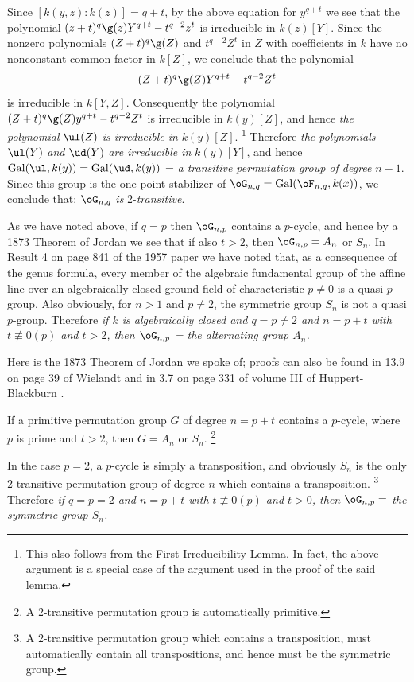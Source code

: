 Since $[k(y,z):k(z)]= q+t$, by the above equation for 
$y^{q+t}$ we see that
the polynomial $(z+t)^q\g(z)Y^{q+t}-t^{q-2}z^t$ is 
irreducible in $k(z)[Y]$.
Since the nonzero polynomials %
$(Z+t)^q\g(Z)$ and $t^{q-2}Z^t$ in $Z$ with
coefficients in $k$ have no nonconstant common factor in 
$k[Z]$, we conclude 
that the polynomial 
$$(Z+t)^q\g(Z)Y^{q+t}-t^{q-2}Z^t$$
is irreducible in 
$k[Y,Z]$. Consequently the polynomial $(Z+t)^q\g(Z)y^{q+
t}-t^{q-2}Z^t$
is irreducible in $k(y)[Z]$, and hence {\it the 
polynomial} $\ul(Z)$
{\it is irreducible in} $k(y)[Z]$. 
\footnote{This also follows from the First Irreducibility 
Lemma. In fact, the
above argument is a special case of the argument used in 
the proof of the said
lemma.}
Therefore {\it the polynomials}
$\ul(Y)$ {\it and} $\ud(Y)$ {\it are irreducible in} 
$k(y)[Y]$,
and hence 
$\operatorname{Gal}(\ul,k(y))= 
\operatorname{Gal}(\ud,k(y))$ = {\it a transitive
permutation group of degree} $n-1$. Since this group is the
one-point stabilizer of $\oG_{n,q}= 
\operatorname{Gal}(\oF_{n,q},k(x))$,
we conclude that: $\oG_{n,q}$ {\it is} 2-{\it transitive}.

As we have noted above, if $q=p$ then
$\oG_{n,p}$ contains a $p$-cycle, and hence by a 1873 
Theorem of Jordan
we see that if also $t>2$, then $\oG_{n,p}=A_n$ or $S_n$. 
In Result 4 on page 
841 of the 1957 paper \cite{A3} we have noted that, as a 
consequence of the 
genus formula, every member of the algebraic fundamental 
group
of the affine line over an algebraically closed
ground field of characteristic $p\ne 0$ is a quasi 
$p$-group.
Also obviously, for $n>1$ and $p\ne 2$, the symmetric 
group $S_n$ is 
not a quasi $p$-group. Therefore {\it if $k$ is 
algebraically
closed and $q=p\ne 2$ and $n=p+t$ with $t\not\equiv 0(p)$ 
and $t>2$, then
$\oG_{n,p}$ = the alternating group $A_n$.}

Here is the 1873 Theorem of Jordan \cite{J3} we spoke of; 
proofs can also 
be found in 13.9 on page 39 of Wielandt \cite{Wi} and in 
3.7 on page 331 of
volume III of Huppert-Blackburn \cite{HB}.

If a primitive permutation group $G$ of degree $n=p+t$ 
contains a
$p$-cycle, where $p$ is prime and $t>2$, then $G=A_n\text{ 
or }S_n$.
\footnote{A 2-transitive permutation group is 
automatically primitive.}
\endproclaim

In the case $p=2$, a $p$-cycle is simply a transposition, 
and obviously
$S_n$ is the only 2-transitive 
permutation group of degree $n$ which contains a 
transposition. 
\footnote{A 2-transitive permutation group which contains 
a transposition,
must automatically 
contain all transpositions, and hence must be the 
symmetric group.}
Therefore {\it if $q=p=2$
and $n=p+t$ with $t\not\equiv 0(p)$ and $t>0$, then 
$\oG_{n,p}=$ the
symmetric group $S_n$.}


